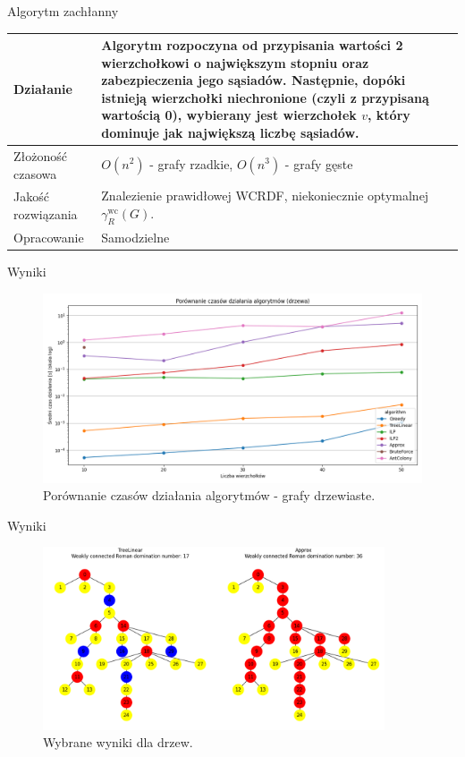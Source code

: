 \documentclass[polish,aspectratio=169]{beamer}
\begin{document}
\begin{frame}{Algorytm zachłanny}
    \begin{table}
        \centering
        \begin{tabular}{|p{4cm}|p{10cm}|}
        \hline
        Działanie & Algorytm rozpoczyna od przypisania wartości 2 wierzchołkowi o największym stopniu oraz zabezpieczenia jego sąsiadów. Następnie, dopóki istnieją wierzchołki niechronione (czyli z przypisaną wartością 0), wybierany jest wierzchołek $v$, który dominuje jak największą liczbę sąsiadów. \\
        \hline
        Złożoność czasowa & $O(n^2)$ - grafy rzadkie, $O(n^3)$ - grafy gęste  \\
        \hline
        Jakość rozwiązania & Znalezienie prawidłowej WCRDF, niekoniecznie optymalnej $\gamma^{\mathrm{wc}}_R(G)$.\\
        \hline
        Opracowanie & Samodzielne  \\
        \hline
        \end{tabular}
        \label{tab:zachlanny}
    \end{table}
\end{frame}

\begin{frame}{Wyniki}
    \begin{figure}
        \centering
        \includegraphics[width=1\textwidth]{images/trees.png}
        \caption{Porównanie czasów działania algorytmów - grafy drzewiaste.}
    \end{figure}    
\end{frame}

\begin{frame}{Wyniki}
    \begin{figure}
        \centering
        \includegraphics[width=0.9\textwidth]{images/image1.png}
        \caption{Wybrane wyniki dla drzew.}
    \end{figure}    
\end{frame}
\end{document}
